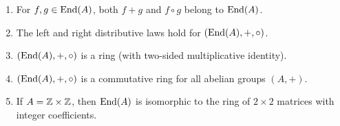 \documentclass[../psets.tex]{subfiles}
\begin{document}
\begin{enumerate}[resume]
    \begin{enumerate}[resume]
        \item For $f,g\in\operatorname{End}(A)$, both $f+g$ and $f\circ g$ belong to $\operatorname{End}(A)$.
        \item The left and right distributive laws hold for $(\operatorname{End}(A),+,\circ)$.
        \item $(\operatorname{End}(A),+,\circ)$ is a ring (with two-sided multiplicative identity).
        \item $(\operatorname{End}(A),+,\circ)$ is a commutative ring for all abelian groups $(A,+)$.
        \item If $A=\mathbb{Z}\times\mathbb{Z}$, then $\operatorname{End}(A)$ is isomorphic to the ring of $2\times 2$ matrices with integer coefficients.
    \end{enumerate}
\end{enumerate}
\end{document}

